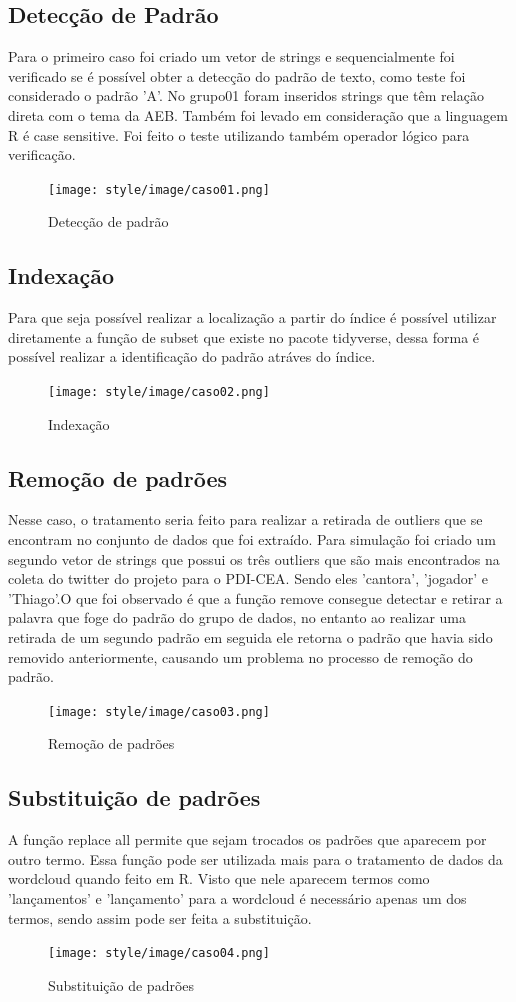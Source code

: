 \documentclass[a4paper]{article}
\begin{document}
\subsection{Detecção de Padrão}
Para o primeiro caso foi criado um vetor de strings e sequencialmente foi verificado se é possível obter a detecção do padrão de texto, como teste foi considerado o padrão 'A'. No grupo01 foram inseridos strings que têm relação direta com o tema da AEB. Também foi levado em consideração que a linguagem R é case sensitive. Foi feito o teste utilizando também operador lógico para verificação. 
\begin{figure}[htb!]
    \centering
    \texttt{[image: style/image/caso01.png]}
    \caption{Detecção de padrão}
    \label{fig:Detecção}
\end{figure}
\subsection{Indexação}
Para que seja possível realizar a localização a partir do índice é possível utilizar diretamente a função de subset que existe no pacote tidyverse, dessa forma é possível realizar a identificação do padrão atráves do índice.
\begin{figure}[htb!]
    \centering
    \texttt{[image: style/image/caso02.png]}
    \caption{Indexação}
    \label{fig:Indexação}
\end{figure}
\subsection{Remoção de padrões}
Nesse caso, o tratamento seria feito para realizar a retirada de outliers que se encontram no conjunto de dados que foi extraído. Para simulação foi criado um segundo vetor de strings que possui os três outliers que são mais encontrados na coleta do twitter do projeto para o PDI-CEA. Sendo eles 'cantora', 'jogador' e 'Thiago'.O que foi observado é que a função remove consegue detectar e retirar a palavra que foge do padrão do grupo de dados, no entanto ao realizar uma retirada de um segundo padrão em seguida ele retorna o padrão que havia sido removido anteriormente, causando um problema no processo de remoção do padrão.
\begin{figure}[htb!]
    \centering
    \texttt{[image: style/image/caso03.png]}
    \caption{Remoção de padrões}
    \label{fig:Remover}
\end{figure}
\subsection{Substituição de padrões}
A função replace all permite que sejam trocados os padrões que aparecem por outro termo. Essa função pode ser utilizada mais para o tratamento de dados da wordcloud quando feito em R. Visto que nele aparecem termos como 'lançamentos' e 'lançamento' para a wordcloud é necessário apenas um dos termos, sendo assim pode ser feita a substituição.
\begin{figure}[htb!]
    \centering
    \texttt{[image: style/image/caso04.png]}
    \caption{Substituição de padrões}
    \label{fig:Substituir}
\end{figure}
\end{document}
